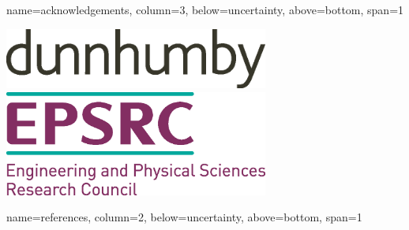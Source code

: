 \documentclass[a0paper,portrait,fontscale=0.35]{baposter}
\begin{document}
\begin{poster}
  {name=acknowledgements, column=3, below=uncertainty, above=bottom, span=1}
  {
    \vspace{1em}
    \begin{center}
      \includegraphics[width=0.65\textwidth]{./img/company_logo.eps}\\[1.5em]
      \includegraphics[width=0.65\textwidth]{./img/epsrc_logo.eps}
    \end{center}
  }

  {name=references, column=2, below=uncertainty, above=bottom, span=1}
  {
    \smaller                                  %
    \renewcommand{\section}[2]{\vspace{0.05em}} %
    
  }

\end{poster}
\end{document}

